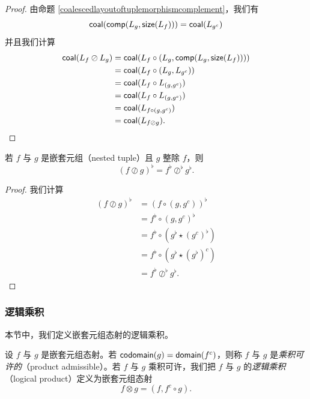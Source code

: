 \begin{proof}
由命题 \ref{coalescedlayoutoftuplemorphismcomplement}，我们有
\[
\mathsf{coal}(\mathsf{comp}(L_g,\mathsf{size}(L_f))) = \mathsf{coal}(L_{g^c})
\]
并且我们计算
    \begin{align*}
        \mathsf{coal}(L_f \oslash L_g) & = \mathsf{coal}(L_f \circ \left(L_g , \mathsf{comp}(L_g,\mathsf{size}(L_f))\right))\\
        & = \mathsf{coal}( L_{f} \circ (L_g, L_{g^c}))\\
        & = \mathsf{coal}(L_{f} \circ L_{(g,g^c)})\\
        & = \mathsf{coal}(L_{f} \circ L_{(g,g^c)})\\
        & = \mathsf{coal}(L_{f \circ (g,g^c)})\\
        & = \mathsf{coal}(L_{f \oslash g}).
    \end{align*}
\end{proof}

\begin{proposition}
    若 $f$ 与 $g$ 是嵌套元组（nested tuple）且 $g$ 整除 $f$，则
    \[
    (f \oslash g)^\flat = f^\flat\oslash^\flat g^\flat.
    \]
\end{proposition}

\begin{proof}
    我们计算
    \begin{align*}
    (f \oslash g)^\flat & = (f \circ (g,g^c))^\flat\\
    & = f^\flat \circ (g,g^c)^\flat\\
    & = f^\flat \circ (g^\flat \star (g^c)^\flat)\\
    & = f^\flat \circ (g^\flat \star (g^\flat)^c)\\
    & = f^\flat \oslash^\flat g^\flat.
    \end{align*}
\end{proof}


\subsubsection{逻辑乘积}
本节中，我们定义嵌套元组态射的逻辑乘积。
\begin{definition}\label{definitionoflogicalproductofnestedtuplemorphisms}
设 $f$ 与 $g$ 是嵌套元组态射。若 $\mathsf{codomain}(g) = \mathsf{domain}(f^c)$，则称 $f$ 与 $g$ 是{\it 乘积可许的}（product admissible）。若 $f$ 与 $g$ 乘积可许，我们把 $f$ 与 $g$ 的{\it 逻辑乘积}（logical product）定义为嵌套元组态射
\[
f \otimes g = (f , f^c \circ g).
\]
\end{definition}




